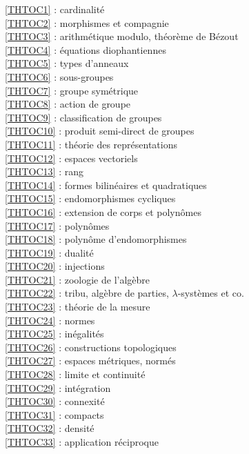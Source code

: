 \ref {THTOC1} : cardinalité\\
\ref {THTOC2} : morphismes et compagnie\\
\ref {THTOC3} : arithmétique modulo, théorème de Bézout\\
\ref {THTOC4} : équations diophantiennes\\
\ref {THTOC5} : types d'anneaux\\
\ref {THTOC6} : sous-groupes\\
\ref {THTOC7} : groupe symétrique\\
\ref {THTOC8} : action de groupe\\
\ref {THTOC9} : classification de groupes\\
\ref {THTOC10} : produit semi-direct de groupes\\
\ref {THTOC11} : théorie des représentations\\
\ref {THTOC12} : espaces vectoriels\\
\ref {THTOC13} : rang\\
\ref {THTOC14} : formes bilinéaires et quadratiques\\
\ref {THTOC15} : endomorphismes cycliques\\
\ref {THTOC16} : extension de corps et polynômes\\
\ref {THTOC17} : polynômes\\
\ref {THTOC18} : polynôme d'endomorphismes\\
\ref {THTOC19} : dualité\\
\ref {THTOC20} : injections\\
\ref {THTOC21} : zoologie de l'algèbre\\
\ref {THTOC22} : tribu, algèbre de parties, \( \lambda \)-systèmes et co.\\
\ref {THTOC23} : théorie de la mesure\\
\ref {THTOC24} : normes\\
\ref {THTOC25} : inégalités\\
\ref {THTOC26} : constructions topologiques\\
\ref {THTOC27} : espaces métriques, normés\\
\ref {THTOC28} : limite et continuité\\
\ref {THTOC29} : intégration\\
\ref {THTOC30} : connexité\\
\ref {THTOC31} : compacts\\
\ref {THTOC32} : densité\\
\ref {THTOC33} : application réciproque\\
